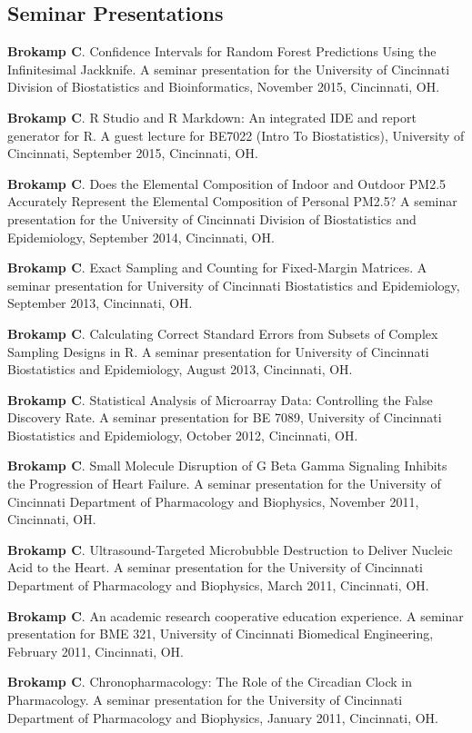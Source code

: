 \documentclass[margin,line]{res}
\newenvironment{list3}{
  \begin{list}{}{%
      \setlength{\itemsep}{0in}
      \setlength{\parsep}{0in} \setlength{\parskip}{0in}
      \setlength{\topsep}{0in} \setlength{\partopsep}{0in} 
      \setlength{\leftmargin}{0in}}}{\end{list}}
\begin{document}
\begin{resume}
\section{\sc Seminar Presentations}
\begin{list3} \itemsep 4pt
\item[] \textbf{Brokamp C}. Confidence Intervals for Random Forest Predictions Using the Infinitesimal Jackknife. A seminar presentation for the University of Cincinnati Division of Biostatistics and Bioinformatics, November 2015, Cincinnati, OH.
\item[] \textbf{Brokamp C}. R Studio and R Markdown: An integrated IDE and report generator for R. A guest lecture for BE7022 (Intro To Biostatistics), University of Cincinnati, September 2015, Cincinnati, OH.
\item[] \textbf{Brokamp C}. Does the Elemental Composition of Indoor and Outdoor PM2.5 Accurately Represent the Elemental Composition of Personal PM2.5? A seminar presentation for the University of Cincinnati Division of Biostatistics and Epidemiology, September 2014, Cincinnati, OH. 
\item[] \textbf{Brokamp C}. Exact Sampling and Counting for Fixed-Margin Matrices.  A seminar presentation for University of Cincinnati Biostatistics and Epidemiology, September 2013, Cincinnati, OH.
\item[] \textbf{Brokamp C}. Calculating Correct Standard Errors from Subsets of Complex Sampling Designs in R.  A seminar presentation for University of Cincinnati Biostatistics and Epidemiology, August 2013, Cincinnati, OH.
\item[] \textbf{Brokamp C}. Statistical Analysis of Microarray Data: Controlling the False Discovery Rate.  A seminar presentation for BE 7089, University of Cincinnati Biostatistics and Epidemiology, October 2012, Cincinnati, OH.
\item[] \textbf{Brokamp C}. Small Molecule Disruption of G Beta Gamma Signaling Inhibits the Progression of Heart Failure.  A seminar presentation for the University of Cincinnati Department of Pharmacology and Biophysics, November 2011, Cincinnati, OH.
\item[] \textbf{Brokamp C}. Ultrasound-Targeted Microbubble Destruction to Deliver Nucleic Acid to the Heart.  A seminar presentation for the University of Cincinnati Department of Pharmacology and Biophysics, March 2011, Cincinnati, OH.
\item[] \textbf{Brokamp C}. An academic research cooperative education experience. A seminar presentation for BME 321, University of Cincinnati Biomedical Engineering, February 2011, Cincinnati, OH.
\item[] \textbf{Brokamp C}. Chronopharmacology: The Role of the Circadian Clock in Pharmacology.  A seminar presentation for the University of Cincinnati Department of Pharmacology and Biophysics, January 2011, Cincinnati, OH.
\end{list3}




\end{resume}
\end{document}
